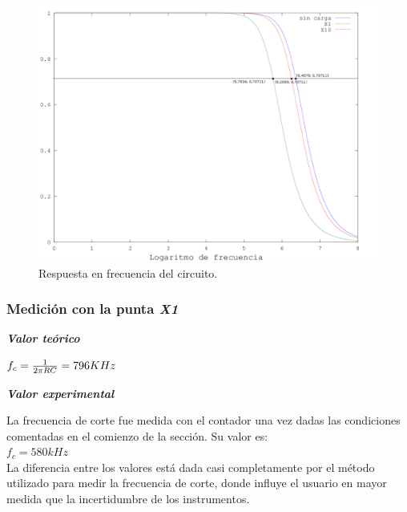 \documentclass{article}
\begin{document}
\begin{figure}[h]
	\centering
	\includegraphics[width=1\textwidth]{images/2-respuesta-en-frecuencia.png}
	\medskip
	\caption{Respuesta en frecuencia del circuito.}
\end{figure}
\bigskip



\subsubsection{Medición con la punta \textit{X1}}
\medskip

\textbf{\textit{Valor teórico}}
\medskip

$f_c = {1 \over 2 \pi RC} = 796 KHz$
\bigskip\medskip

\textbf{\textit{Valor experimental}}
\medskip

	La frecuencia de corte fue medida con el contador una vez dadas las condiciones comentadas en el comienzo de la sección. Su valor es: \\

$f_c = 580 kHz$ \\

La diferencia entre los valores está dada casi completamente por el método utilizado para medir la frecuencia de corte, donde influye el usuario en mayor medida que la incertidumbre de los instrumentos.
\bigskip\medskip



\end{document}
